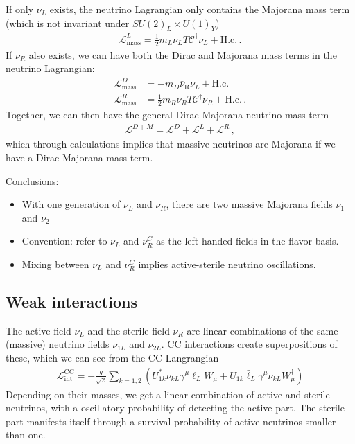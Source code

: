\documentclass[twocolumn]{article}
\newcommand{\n}[1]{\ensuremath{\nu_{#1}}}
\newcommand{\an}[1]{\ensuremath{\bar{\nu}_{\text{#1}}}}
\begin{document}
If only $\nu_L$ exists, the neutrino Lagrangian only contains the Majorana mass term (which is not invariant under $SU(2)_L \times U(1)_Y$)
\begin{align*}
  \mathcal{L}^L_\text{mass} = \frac{1}{2} m_L \n{L}{T} \mathcal{C}^\dagger \n{L} + \text{H.c.}\,.
\end{align*}
If $\nu_R$ also exists, we can have both the Dirac and Majorana mass terms in the neutrino Lagrangian:
\begin{align*}
  \mathcal{L}^D_\text{mass} &= -m_D \an{R} \n{L} + \text{H.c.} \\
  \mathcal{L}^R_\text{mass} &= \frac{1}{2}m_R \n{R}{T} \mathcal{C}^\dagger \n{R} + \text{H.c.}\,.
\end{align*}
Together, we can then have the general Dirac-Majorana neutrino mass term 
\begin{align*}
  \mathcal{L}^{D+M} = \mathcal{L}^D + \mathcal{L}^L + \mathcal{L}^R\,,
\end{align*}
which through calculations implies that massive neutrinos are Majorana if we have a Dirac-Majorana mass term.

Conclusions:
\begin{itemize}
  \item With one generation of $\nu_L$ and $\nu_R$, there are two massive Majorana fields $\n{1}$ and $\n{2}$
  \item Convention: refer to $\nu_L$ and $\nu_R^C$ as the left-handed fields in the flavor basis.
  \item Mixing between $\nu_L$ and $\nu_R^C$ implies active-sterile neutrino oscillations.
\end{itemize}

\subsection{Weak interactions}
The active field $\nu_L$ and the sterile field $\nu_R$ are linear combinations of the same (massive) neutrino fields $\nu_{1L}$ and $\nu_{2L}$. CC interactions create superpositions of these, which we can see from the CC Langrangian
\begin{align*}
  \mathcal{L}^\text{CC}_\text{int} = -\frac{g}{\sqrt{2}} \sum_{k=1,2} (U^*_{1k}\bar{\nu}_{kL}\gamma^\mu \ell_L W_\mu + U_{1k}\bar{\ell}_L \gamma^\mu \nu_{kL} W^\dagger_\mu)
\end{align*}
Depending on their masses, we get a linear combination of active and sterile neutrinos, with a oscillatory probability of detecting the active part. The sterile part manifests itself through a survival probability of active neutrinos smaller than one.
\end{document}
